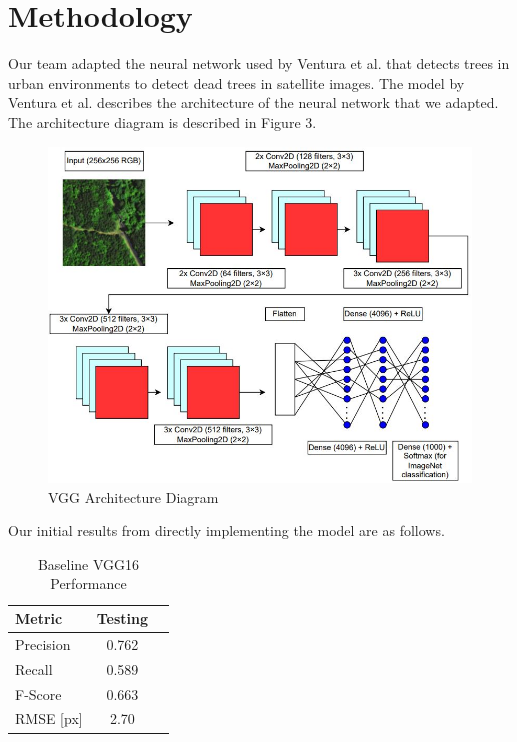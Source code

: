 \documentclass[conference]{ieeetran}
\begin{document}
\section{Methodology}

Our team adapted the neural network used by Ventura et al. that detects trees in urban environments to detect dead trees in satellite images. The model by Ventura et al. describes the architecture of the neural network that we adapted. The  architecture diagram is described in Figure 3. 

\begin{figure}[htbp]
  \centering
  \includegraphics[width=\linewidth]{VGG_diagram.JPG}
  \caption{VGG Architecture Diagram}
  \label{fig:my_label}
\end{figure}

Our initial results from directly implementing the model are as follows. 

\begin{table}[htbp]
  \centering
  \begin{tabular}{lcc}
    \hline
    \textbf{Metric} & \textbf{Testing} \\
    \hline
    Precision & 0.762 \\
    Recall    & 0.589 \\
    F-Score   & 0.663 \\
    RMSE [px] & 2.70 \\
    \hline
  \end{tabular}
  \caption{Baseline VGG16 Performance}
  \label{tab:metrics}
\end{table}
\end{document}
